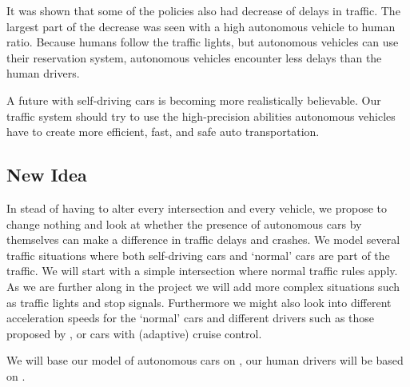 It was shown that some of the policies also had decrease of delays in traffic. The largest part of the decrease was seen with a high autonomous vehicle to human ratio. Because humans follow the traffic lights, but autonomous vehicles can use their reservation system, autonomous vehicles encounter less delays than the human drivers. 

A future with self-driving cars is becoming more realistically believable. Our traffic system should try to use the high-precision abilities autonomous vehicles have to create more efficient, fast, and safe auto transportation.


\subsection{New Idea}
\label{sub:intro:new_idea}

In stead of having to alter every intersection and every vehicle, we propose to change nothing and look at whether the presence of autonomous cars by themselves can make a difference in traffic delays and crashes. 
We model several traffic situations where both self-driving cars and `normal' cars are part of the traffic. We will start with a simple intersection where normal traffic rules apply. As we are further along in the project we will add more complex situations such as traffic lights and stop signals. Furthermore we might also look into different acceleration speeds for the `normal' cars and different drivers such as those proposed by \textcite{paruchuri2002multi}, or cars with (adaptive) cruise control.

We will base our model of autonomous cars on \textcite{jiang2010microscopic}, our human drivers will be based on \textcite{paruchuri2002multi}.










